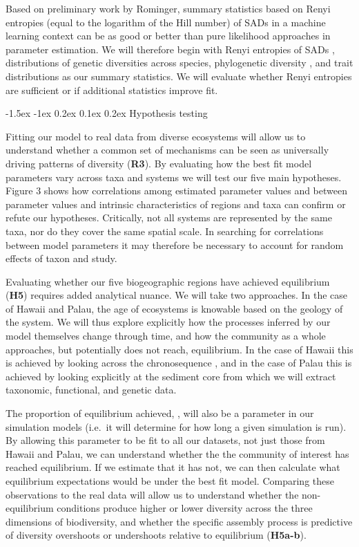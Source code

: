 \documentclass[11pt]{article}
\makeatletter
\renewcommand\subsubsection{\@startsection{subsection}{1}{\z@}%
                                  {-1.5ex \@plus -1ex \@minus 0.2ex}%
                                  {0.1ex \@plus 0.2ex}%
                                  {\normalfont\bfseries}}
\makeatother
\begin{document}
Based on preliminary work by Rominger, summary statistics based on Renyi
entropies (equal to the logarithm of the Hill number) of SADs in a
machine learning context can be as good or better than pure likelihood
approaches in parameter estimation. We will therefore begin with Renyi
entropies of SADs \cite{May2017-ji}, distributions of genetic
diversities across species, phylogenetic diversity \cite{Chao2010-oo},
and trait distributions as our summary statistics. We will evaluate
whether Renyi entropies are sufficient or if additional statistics
improve fit.

\subsubsection{Hypothesis testing}\label{hypothesis-testing}

Fitting our model to real data from diverse ecosystems will allow us to
understand whether a common set of mechanisms can be seen as universally
driving patterns of diversity (\textbf{R3}). By evaluating how the best
fit model parameters vary across taxa and systems we will test our five
main hypotheses. Figure 3 shows how correlations among estimated
parameter values and between parameter values and intrinsic
characteristics of regions and taxa can confirm or refute our
hypotheses. Critically, not all systems are represented by the same
taxa, nor do they cover the same spatial scale. In searching for
correlations between model parameters it may therefore be necessary to
account for random effects of taxon and study.

Evaluating whether our five biogeographic regions have achieved
equilibrium (\textbf{H5}) requires added analytical nuance. We will take
two approaches. In the case of Hawaii and Palau, the age of ecosystems
is knowable based on the geology of the system. We will thus explore
explicitly how the processes inferred by our model themselves change
through time, and how the community as a whole approaches, but
potentially does not reach, equilibrium. In the case of Hawaii this is
achieved by looking across the chronosequence \cite{Rominger2015-kb},
and in the case of Palau this is achieved by looking explicitly at the
sediment core from which we will extract taxonomic, functional, and
genetic data.

The proportion of equilibrium achieved, \citep[sensu][]{Rosindell2013-di},
will also be a parameter in our simulation models (i.e.~it will
determine for how long a given simulation is run). By allowing this
parameter to be fit to all our datasets, not just those from Hawaii and
Palau, we can understand whether the the community of interest has
reached equilibrium. If we estimate that it has not, we can then
calculate what equilibrium expectations would be under the best fit
model. Comparing these observations to the real data will allow us to
understand whether the non-equilibrium conditions produce higher or
lower diversity across the three dimensions of biodiversity, and whether
the specific assembly process is predictive of diversity overshoots or
undershoots relative to equilibrium (\textbf{H5a-b}).
\end{document}
